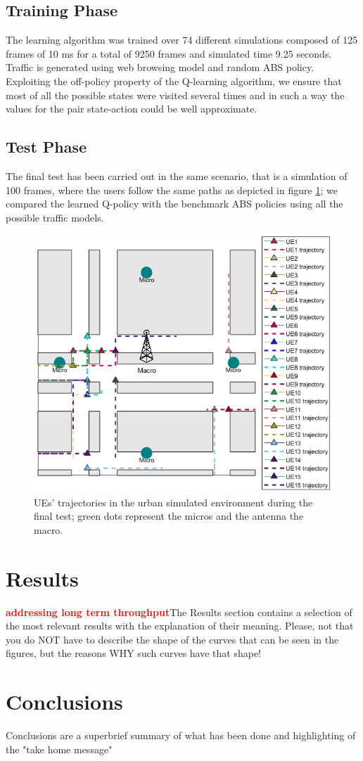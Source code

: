 \documentclass[conference,10pt]{IEEEtran}
\begin{document}
\subsection{Training Phase}
The learning algorithm was trained over 74 different simulations composed of 125 frames of 10 ms for a total of 9250 frames and simulated time 9.25 seconds. Traffic is generated using web browsing model and random ABS policy.
Exploiting the off-policy property of the Q-learning algorithm, we ensure that most of all the possible states were visited several times and in such a way the values for the pair state-action could be well approximate.
\subsection{Test Phase}
The final test has been carried out in the same scenario, that is a simulation of 100 frames, where the users follow the same paths as depicted in figure \ref{img:map}; we compared the learned Q-policy with the benchmark ABS policies using all the possible traffic models.
\begin{figure}[h]
\includegraphics[scale=0.57]{figures/traj.png}
\caption{UEs' trajectories in the urban simulated environment during the final test; green dots represent the micros and the antenna the macro.}\label{img:map} 
\end{figure}
      
\section{Results}\label{sec:res}
\textbf{\textcolor{red}{addressing long term throughput}}The Results section contains a selection of the most relevant results with the explanation of their meaning. Please, not that you do NOT have to describe the shape of the curves that can be seen in the figures, but the reasons WHY such curves have that shape!
\section{Conclusions}\label{sec:conclusion}
Conclusions are a superbrief summary of what has been done and highlighting of the "take home message"
\newpage
\nocite{*}


\end{document}
